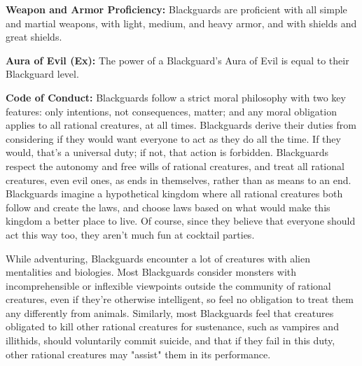 \classfeatures

\textbf{Weapon and Armor Proficiency:} Blackguards are proficient with all simple and martial weapons, with light, medium, and heavy armor, and with shields and great shields.

\textbf{Aura of Evil (Ex):} The power of a Blackguard's Aura of Evil is equal to their Blackguard level.

\textbf{Code of Conduct:} Blackguards follow a strict moral philosophy with two key features: only intentions, not consequences, matter; and any moral obligation applies to all rational creatures, at all times. Blackguards derive their duties from considering if they would want everyone to act as they do all the time. If they would, that's a universal duty; if not, that action is forbidden. Blackguards respect the autonomy and free wills of rational creatures, and treat all rational creatures, even evil ones, as ends in themselves, rather than as means to an end. Blackguards imagine a hypothetical kingdom where all rational creatures both follow and create the laws, and choose laws based on what would make this kingdom a better place to live. Of course, since they believe that everyone should act this way too, they aren't much fun at cocktail parties.

While adventuring, Blackguards encounter a lot of creatures with alien mentalities and biologies. Most Blackguards consider monsters
with incomprehensible or inflexible viewpoints outside the community of rational creatures, even if they're otherwise intelligent, so feel no obligation to treat them any differently from animals. Similarly, most Blackguards feel that creatures obligated to kill other rational creatures for sustenance, such as vampires and illithids, should voluntarily commit suicide, and that if they fail in this duty, other rational creatures may "assist" them in its performance.

